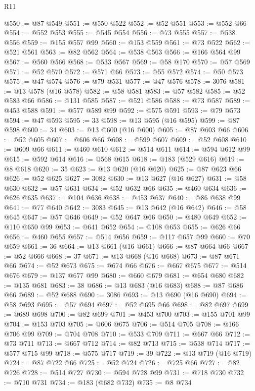 \begin{lexlean}{R11}
\begin{coremodule}
@550 := @87 @549
@551 := @550 @522
@552 := @52 @551
@553 := @552 @66
@554 := @552 @553
@555 := @545 @554
@556 := @73 @555
@557 := @538 @556
@559 := @155 @557 @99
@560 := @153 @559
@561 := @73 @522
@562 := @521 @561
@563 := @82 @562
@564 := @538 @563
@566 := @166 @564 @99
@567 := @560 @566
@568 := @533 @567
@569 := @58 @170
@570 := @57 @569
@571 := @52 @570
@572 := @571 @66
@573 := @55 @572
@574 := @50 @573
@575 := @47 @574
@576 := @79 @531
@577 := @47 @576
@578 := 3076
@581 := @13 @578 (@16 @578)
@582 := @58 @581
@583 := @57 @582
@585 := @52 @583 @66
@586 := @131 @585
@587 := @521 @586
@588 := @73 @587
@589 := @453 @588
@591 := @577 @589 @99
@592 := @575 @591
@593 := @79 @573
@594 := @47 @593
@595 := 33
@598 := @13 @595 (@16 @595)
@599 := @87 @598
@600 := 34
@603 := @13 @600 (@16 @600)
@605 := @87 @603 @66
@606 := @52 @605
@607 := @606 @66
@608 := @599 @607
@609 := @52 @608
@610 := @609 @66
@611 := @460 @610
@612 := @514 @611
@614 := @594 @612 @99
@615 := @592 @614
@616 := @568 @615
@618 := @183 (@529 @616)
@619 := @8 @618
@620 := 35
@623 := @13 @620 (@16 @620)
@625 := @87 @623 @66
@626 := @52 @625
@627 := 3082
@630 := @13 @627 (@16 @627)
@631 := @58 @630
@632 := @57 @631
@634 := @52 @632 @66
@635 := @460 @634
@636 := @626 @635
@637 := @104 @636
@638 := @453 @637
@640 := @86 @638 @99
@641 := @77 @640
@642 := 3083
@645 := @13 @642 (@16 @642)
@646 := @58 @645
@647 := @57 @646
@649 := @52 @647 @66
@650 := @480 @649
@652 := @110 @650 @99
@653 := @641 @652
@654 := @108 @653
@655 := @626 @66
@656 := @460 @655
@657 := @514 @656
@659 := @117 @657 @99
@660 := @70 @659
@661 := 36
@664 := @13 @661 (@16 @661)
@666 := @87 @664 @66
@667 := @52 @666
@668 := 37
@671 := @13 @668 (@16 @668)
@673 := @87 @671 @66
@674 := @52 @673
@675 := @674 @66
@676 := @667 @675
@677 := @514 @676
@679 := @137 @677 @99
@680 := @660 @679
@681 := @654 @680
@682 := @135 @681
@683 := 38
@686 := @13 @683 (@16 @683)
@688 := @87 @686 @66
@689 := @52 @688
@690 := 3086
@693 := @13 @690 (@16 @690)
@694 := @58 @693
@695 := @57 @694
@697 := @52 @695 @66
@698 := @82 @697
@699 := @689 @698
@700 := @82 @699
@701 := @453 @700
@703 := @155 @701 @99
@704 := @153 @703
@705 := @606 @675
@706 := @514 @705
@708 := @166 @706 @99
@709 := @704 @708
@710 := @533 @709
@711 := @667 @66
@712 := @73 @711
@713 := @667 @712
@714 := @82 @713
@715 := @538 @714
@717 := @577 @715 @99
@718 := @575 @717
@719 := 39
@722 := @13 @719 (@16 @719)
@724 := @87 @722 @66
@725 := @52 @724
@726 := @725 @66
@727 := @82 @726
@728 := @514 @727
@730 := @594 @728 @99
@731 := @718 @730
@732 := @710 @731
@734 := @183 (@682 @732)
@735 := @8 @734

\end{coremodule}
\end{lexlean}

